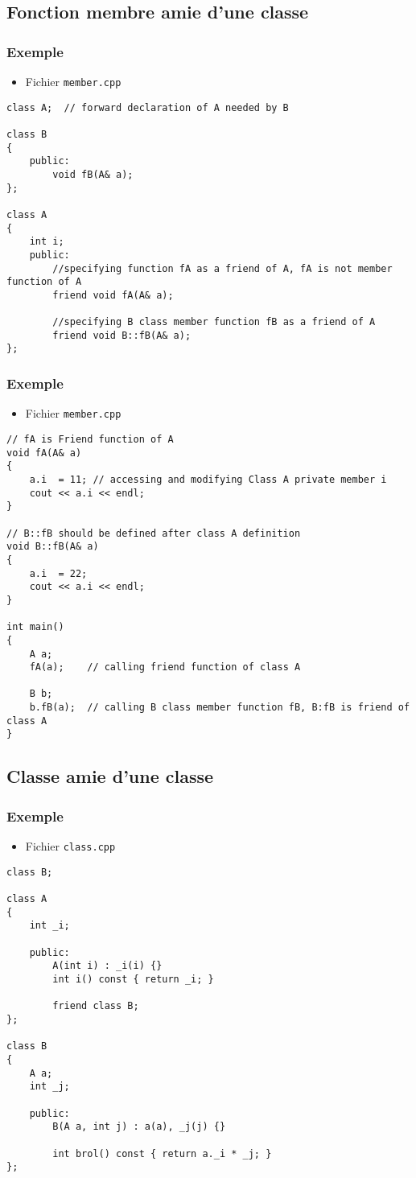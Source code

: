\subsection{Fonction membre amie d'une classe}

\begin{frame}[containsverbatim]
\frametitle{Exemple}
\begin{itemize}
\item Fichier \texttt{member.cpp}
\end{itemize}
\begin{lstlisting}
class A;  // forward declaration of A needed by B

class B
{
	public:
	    void fB(A& a);
};

class A
{
	int i;
	public:
		//specifying function fA as a friend of A, fA is not member function of A
		friend void fA(A& a);    
	    
		//specifying B class member function fB as a friend of A
		friend void B::fB(A& a); 
};
\end{lstlisting}
\end{frame}

\begin{frame}[containsverbatim]
\frametitle{Exemple}
\begin{itemize}
\item Fichier \texttt{member.cpp}
\end{itemize}
\begin{lstlisting}
// fA is Friend function of A
void fA(A& a)
{
    a.i  = 11; // accessing and modifying Class A private member i
    cout << a.i << endl;
}

// B::fB should be defined after class A definition
void B::fB(A& a)
{
    a.i  = 22; 
    cout << a.i << endl;
}

int main()
{
    A a;
    fA(a);    // calling friend function of class A

    B b;
    b.fB(a);  // calling B class member function fB, B:fB is friend of class A
}
\end{lstlisting}
\end{frame}

\subsection{Classe amie d'une classe}

\begin{frame}[containsverbatim]
\frametitle{Exemple}
\begin{itemize}
\item Fichier \texttt{class.cpp}
\end{itemize}
\begin{lstlisting}
class B;

class A
{
	int _i;
	
	public:
		A(int i) : _i(i) {}
		int i() const { return _i; }

		friend class B;
};

class B
{
	A a;
	int _j;
	
	public:
		B(A a, int j) : a(a), _j(j) {}

		int brol() const { return a._i * _j; }	
};
\end{lstlisting}
\end{frame}

